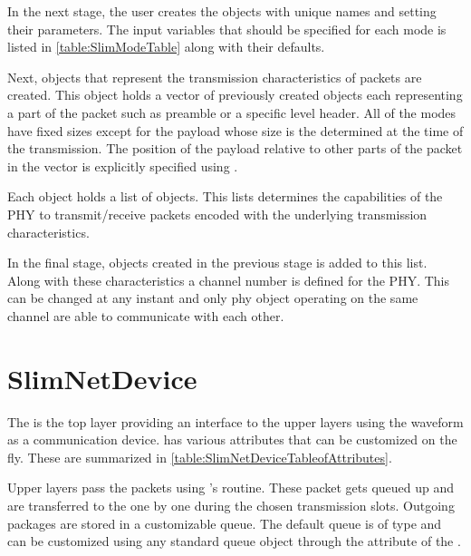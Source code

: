 In the next stage, the user creates the  objects with unique names and setting their parameters. 
The input variables that should be specified for each mode is listed in \cref{table:SlimModeTable} along with their defaults.



Next,  objects that represent the transmission characteristics of packets are created. This object holds a vector of previously created  objects each representing a part of the packet such as preamble or a specific level header. All of the modes have fixed sizes except for the payload whose size is the determined at the time of the transmission. The position of the payload relative to other parts of the packet in the vector is explicitly specified using .



Each  object holds a list of  objects. This lists determines the capabilities of the PHY to transmit/receive packets encoded with the underlying transmission characteristics. 

In the final stage,  objects created in the previous stage is added to this list. Along with these characteristics a channel number is defined for the PHY. This can be changed at any instant and only phy object operating on the same channel are able to communicate with each other. 

\section{SlimNetDevice}

The  is the top layer providing an interface to the upper layers using the waveform as a communication device.
 has various attributes that can be customized on the fly. These are summarized in \cref{table:SlimNetDeviceTableofAttributes}.




Upper layers pass the packets using 's  routine. These packet gets queued up and are transferred to the  one by one during the chosen transmission slots. Outgoing packages are stored in a customizable queue. The default queue is of  type and can be customized using any standard queue object through the attribute  of the .

